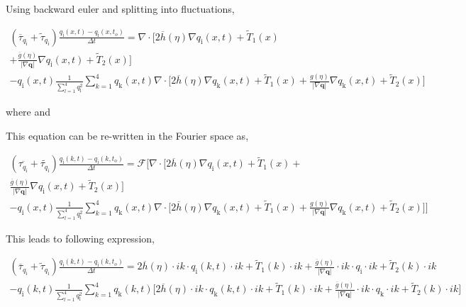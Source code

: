 \documentclass[a4paper,11pt,dvipsnames]{article}
\begin{document}
Using backward euler and splitting into fluctuations,

\begin{multline}
	( \overline{\tau}_{q_{\text{i}}} + \tilde{\tau}_{q_{\text{i}}} ) \frac{q_{\text{i}}(x,t) - q_{\text{i}}(x,t_{o})}{\Delta t} = \nabla \cdot \biggl [ 2 \overline{h}(\eta) \nabla q_{\text{i}} (x,t) + \tilde{T}_1 (x) \\ 
	+ \frac{\overline{g}(\eta)}{| \nabla \boldsymbol{q} |} \nabla q_{\text{i}} (x,t) + \tilde{T}_2 (x)\biggr ] \\
	- q_{\text{i}}(x,t) \frac{1}{\sum_{l = 1}^{4} q_{\text{l}}^2 } \sum_{k = 1}^{4} q_{\text{k}}(x,t) \nabla \cdot \biggl [ 2 \overline{h}(\eta) \nabla q_{\text{k}} (x,t) + \tilde{T}_1 (x) + \frac{g(\eta)}{| \nabla \boldsymbol{q} |} \nabla q_{\text{k}} (x,t)     + \tilde{T}_2 (x)\biggr ] \label{eq:37}
\end{multline} 

where  and 

This equation can be re-written in the Fourier space as, 

\begin{multline}
	( \overline{\tau_{q_{\text{i}}}} + \tilde{\tau_{q_{\text{i}}}} ) \frac{q_{\text{i}}(k,t) - q_{\text{i}}(k,t_{o})}{\Delta t} = \mathcal{F} \biggl [ \nabla \cdot \biggl [ 2 \overline{h}(\eta) \nabla q_{\text{i}} (x,t) + \tilde{T}_1 (x) + \\
	\frac{\overline{g}(\eta)}{| \nabla \boldsymbol{q} |} \nabla q_{\text{i}} (x,t) + \tilde{T}_2 (x)\biggr ] \\
	- q_{\text{i}}(x,t) \frac{1}{\sum_{l = 1}^{4} q_{\text{l}}^2 } \sum_{k = 1}^{4} q_{\text{k}}(x,t) \nabla \cdot \biggl [ 2 \overline{h}(\eta) \nabla q_{\text{k}} (x,t) + \tilde{T}_1 (x) + \frac{g(\eta)}{| \nabla \boldsymbol{q} |} \nabla q_{\text{k}} (x,t)     + \tilde{T}_2 (x)\biggr ] \biggr ] \label{eq:38}
\end{multline} 

This leads to following expression, 

\begin{multline}
	( \overline{\tau}_{q_{\text{i}}} + \tilde{\tau}_{q_{\text{i}}} ) \frac{q_{\text{i}}(k,t) - q_{\text{i}}(k,t_{o})}{\Delta t} = 2 \overline{h}(\eta) \cdot ik \cdot q_{\text{i}} (k,t) \cdot ik + \tilde{T}_1 (k) \cdot ik + \frac{\overline{g}(\eta)}{| \nabla \boldsymbol{q}| } \cdot ik \cdot q_{\text{i}} \cdot ik + \tilde{T}_2 (k) \cdot ik \\ 
	- q_{\text{i}}(k,t) \frac{1}{\sum_{l = 1}^{4} q_{\text{l}}^2 } \sum_{k = 1}^{4} q_{\text{k}}(k,t) \biggl [ 2 \overline{h}(\eta) \cdot ik \cdot q_{\text{k}} (k,t) \cdot ik + \tilde{T}_1 (k) \cdot ik + \frac{\overline{g}(\eta)}{| \nabla \boldsymbol{q}| } \cdot ik \cdot q_{\text{k}} \cdot ik + \tilde{T}_2 (k) \cdot ik \biggr ] \label{eq:38}
\end{multline}
\end{document}
